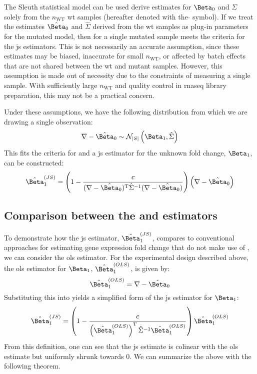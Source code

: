 The Sleuth statistical model can be used derive estimates for $\Beta_0$ and $\Sigma$ solely from the $n_\mathrm{WT}$ \gls{wt} samples (hereafter denoted with the $\hat{}$ symbol).
If we treat the estimates $\hat{\Beta}_0$ and $\hat{\Sigma}$ derived from the \gls{wt} samples as plug-in parameters for the mutated model, then  for a single mutated sample meets the criteria for the \gls{js} estimators.
This is not necessarily an accurate assumption, since these estimates may be biased, inaccurate for small $n_\mathrm{WT}$, or affected by batch effects that are not shared between the \gls{wt} and mutant samples.
However, this assumption is made out of necessity due to the constraints of measuring a single sample.
With sufficiently large $n_\mathrm{WT}$ and quality control in \gls{rnaseq} library preparation, this may not be a practical concern.

Under these assumptions, we have the following distribution from which we are drawing a single observation:
%
\begin{equation}
  \nabla - \hat{\Beta}_0 \sim \mathcal{N}_{|S|} \left( \Beta_1, \hat{\Sigma} \right)
  \label{eqn:delta_mut_js_dist}
\end{equation}
%
This fits the criteria for  and a \gls{js} estimator for the unknown fold change, $\Beta_1$, can be constructed:
%
\begin{equation}
  \fcjs = \left( 1 - \frac{c}{(\nabla - \hat{\Beta}_0)^\tran \hat{\Sigma}^{-1} (\nabla - \hat{\Beta}_0)} \right) \left(\nabla - \hat{\Beta}_0 \right)
  \label{eqn:js_defn}
\end{equation}

\subsection{Comparison between the  and  estimators}

To demonstrate how the \gls{js} estimator, $\fcjs$, compares to conventional approaches for estimating gene expression fold change that do not make use of , we can consider the \gls{ols} estimator.
For the experimental design described above, the \gls{ols} estimator for $\Beta_1$, $\fcols$, is given by:
%
\begin{equation}
  \fcols = \nabla - \hat{\Beta}_0
  \label{eqn:ols_defn}
\end{equation}
%
Substituting this into  yields a simplified form of the \gls{js} estimator for $\Beta_1$:
%
\begin{equation}
  \fcjs = \left( 1 - \frac{c}{\left( \fcols \right)^\tran \hat{\Sigma}^{-1} \fcols} \right) \fcols
  \label{eqn:js_defn_ols}
\end{equation}
%
From this definition, one can see that the \gls{js} estimate is colinear with the \gls{ols} estimate but uniformly shrunk towards 0.
We can summarize the above with the following theorem.

